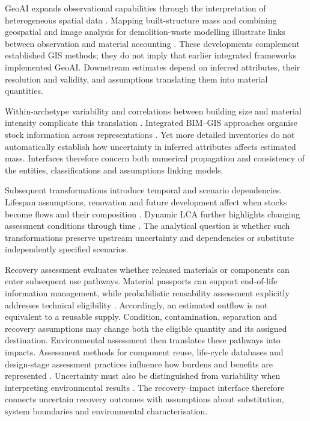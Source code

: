 GeoAI expands observational capabilities through the interpretation of heterogeneous spatial data \citep{I08,I09}. Mapping built-structure mass and combining geospatial and image analysis for demolition-waste modelling illustrate links between observation and material accounting \citep{I10,U01}. These developments complement established GIS methods; they do not imply that earlier integrated frameworks implemented GeoAI. Downstream estimates depend on inferred attributes, their resolution and validity, and assumptions translating them into material quantities.

Within-archetype variability and correlations between building size and material intensity complicate this translation \citep{U07,I13}. Integrated BIM--GIS approaches organise stock information across representations \citep{U08}. Yet more detailed inventories do not automatically establish how uncertainty in inferred attributes affects estimated mass. Interfaces therefore concern both numerical propagation and consistency of the entities, classifications and assumptions linking models.

Subsequent transformations introduce temporal and scenario dependencies. Lifespan assumptions, renovation and future development affect when stocks become flows and their composition \citep{U11,I16,I17,I18}. Dynamic LCA further highlights changing assessment conditions through time \citep{U14}. The analytical question is whether such transformations preserve upstream uncertainty and dependencies or substitute independently specified scenarios.

Recovery assessment evaluates whether released materials or components can enter subsequent use pathways. Material passports can support end-of-life information management, while probabilistic reusability assessment explicitly addresses technical eligibility \citep{I20,I21}. Accordingly, an estimated outflow is not equivalent to a reusable supply. Condition, contamination, separation and recovery assumptions may change both the eligible quantity and its assigned destination. Environmental assessment then translates these pathways into impacts. Assessment methods for component reuse, life-cycle databases and design-stage assessment practices influence how burdens and benefits are represented \citep{I22,I23,I24}. Uncertainty must also be distinguished from variability when interpreting environmental results \citep{I25}. The recovery--impact interface therefore connects uncertain recovery outcomes with assumptions about substitution, system boundaries and environmental characterisation.

